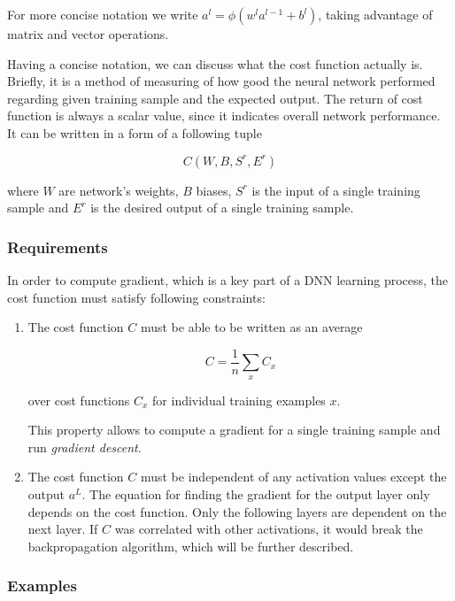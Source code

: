 For more concise notation we write $a^l = \phi(w^l a^{l-1} + b^l)$, taking advantage of matrix and vector operations.

Having a concise notation, we can discuss what the cost function actually is. Briefly, it is a method of measuring of how good the neural network performed regarding given training sample and the expected output. The return of cost function is always a scalar value, since it indicates overall network performance. It can be written in a form of a following tuple

\[C(W, B, S^r, E^r)\]

where $W$ are network's weights, $B$ biases, $S^r$ is the input of a single training sample and $E^r$ is the desired output of a single training sample.

\subsubsection*{Requirements}
\label{sub2:cost-requirements}

In order to compute gradient, which is a key part of a DNN learning process, the cost function must satisfy following constraints:

\begin{enumerate}
    \item The cost function $C$ must be able to be written as an average
    
        \[C = \frac{1}{n} \sum_x C_x\]
        
        over cost functions $C_x$ for individual training examples $x$.
    
        This property allows to compute a gradient for a single training sample and run \emph{gradient descent}.
    
    \item The cost function $C$ must be independent of any activation values except the output $a^L$.
    The equation for finding the gradient for the output layer only depends on the cost function. Only the following layers are dependent on the next layer. If $C$ was correlated with other activations, it would break the backpropagation algorithm, which will be further described.
\end{enumerate}

\subsubsection*{Examples}
\label{sub2:cost-function-examples}


